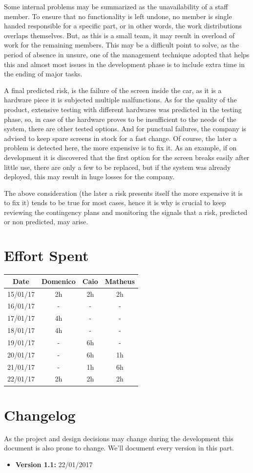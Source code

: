 \documentclass[a4paper]{article}
\begin{document}
Some internal problems may be summarized as the unavailability of a staff member. To ensure that no functionality is left undone, no member is single handed responsible for a specific part, or in other words, the work distributions overlaps themselves.  But, as this is a small team, it may result in overload of work for the remaining members. This may be a difficult point to solve, as the period of absence in unsure, one of the management technique adopted that helps this and almost most issues in the development phase is to include extra time in the ending of major tasks.      

A final predicted risk, is the failure of the screen inside the car, as it is a hardware piece it is subjected multiple malfunctions. As for the quality of the product, extensive testing with different hardwares was predicted in the testing phase, so, in case of the hardware proves to be insufficient to the needs of the system, there are other tested options. And for punctual failures, the company is advised to keep spare screens in stock for a fast change. Of course, the later a problem is detected here, the more expensive is to fix it. As an example, if on development it is discovered that the first option for the screen breaks easily after little use, there are only a few to be replaced, but if the system was already deployed, this may result in huge losses for the company. 

The above consideration (the later a risk presents itself the more expensive it is to fix it) tends to be true for most cases, hence it is why is crucial to keep reviewing the contingency plans and monitoring the signals that a risk, predicted or non predicted, may arise. 


\newpage
\section{Effort Spent}
\begin{tabular}{ | c | c | c | c | }
\hline
	\textbf {Date} & \textbf {Domenico} & \textbf {Caio} & \textbf {Matheus} \\ \hline
	15/01/17& 2h & 2h & 2h  \\ \hline
	16/01/17& - & - & - \\ \hline
	17/01/17& 4h & - & - \\ \hline
	18/01/17& 4h & - & - \\ \hline
	19/01/17& - & 6h & - \\ \hline
	20/01/17& - & 6h & 1h \\ \hline
	21/01/17& - & 1h & 6h \\ \hline
	22/01/17& 2h & 2h & 2h \\ \hline
\end{tabular}
\newpage

\section{Changelog}
As the project and design decisions may change during the development this document is also prone to change.
We'll document every version in this part.
\begin{itemize}
\item \textbf {Version 1.1:} 22/01/2017
\end{itemize}
\end{document}
